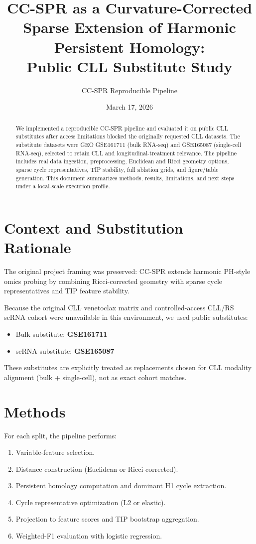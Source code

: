 \documentclass[11pt]{article}
\title{CC-SPR as a Curvature-Corrected Sparse Extension of Harmonic Persistent Homology:\\Public CLL Substitute Study}
\author{CC-SPR Reproducible Pipeline}
\date{March 17, 2026}
\begin{document}
\maketitle

\begin{abstract}
We implemented a reproducible CC-SPR pipeline and evaluated it on public CLL substitutes after access limitations blocked the originally requested CLL datasets. The substitute datasets were GEO GSE161711 (bulk RNA-seq) and GSE165087 (single-cell RNA-seq), selected to retain CLL and longitudinal-treatment relevance. The pipeline includes real data ingestion, preprocessing, Euclidean and Ricci geometry options, sparse cycle representatives, TIP stability, full ablation grids, and figure/table generation. This document summarizes methods, results, limitations, and next steps under a local-scale execution profile.
\end{abstract}

\section{Context and Substitution Rationale}
The original project framing was preserved: CC-SPR extends harmonic PH-style omics probing by combining Ricci-corrected geometry with sparse cycle representatives and TIP feature stability.

Because the original CLL venetoclax matrix and controlled-access CLL/RS scRNA cohort were unavailable in this environment, we used public substitutes:
\begin{itemize}
\item Bulk substitute: \textbf{GSE161711}
\item scRNA substitute: \textbf{GSE165087}
\end{itemize}

These substitutes are explicitly treated as replacements chosen for CLL modality alignment (bulk + single-cell), not as exact cohort matches.

\section{Methods}
For each split, the pipeline performs:
\begin{enumerate}
\item Variable-feature selection.
\item Distance construction (Euclidean or Ricci-corrected).
\item Persistent homology computation and dominant H1 cycle extraction.
\item Cycle representative optimization (L2 or elastic).
\item Projection to feature scores and TIP bootstrap aggregation.
\item Weighted-F1 evaluation with logistic regression.
\end{enumerate}
\end{document}
